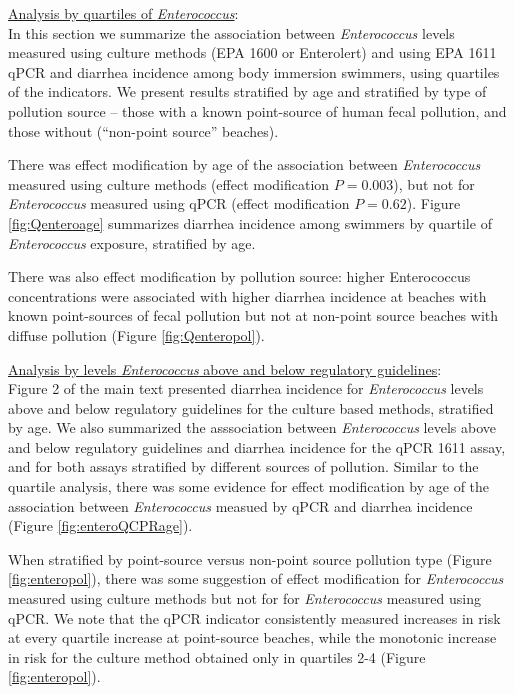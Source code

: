\documentclass[12pt]{article}\usepackage[]{graphicx}\usepackage[]{color}
\begin{document}
\underline{Analysis by quartiles of \textit{Enterococcus}}: \\
In this section we summarize the association between \emph{Enterococcus} levels measured using culture methods (EPA 1600 or Enterolert) and using EPA 1611 qPCR and diarrhea incidence among body immersion swimmers, using quartiles of the indicators.  We present results stratified by age and stratified by type of pollution source -- those with a known point-source of human fecal pollution, and those without (``non-point source'' beaches).  

There was effect modification by age of the association between \textit{Enterococcus} measured using culture methods (effect modification $P=0.003$), but not for \textit{Enterococcus} measured using qPCR (effect modification $P=0.62$).  Figure  \ref{fig:Qenteroage} summarizes diarrhea incidence among swimmers by quartile of \textit{Enterococcus} exposure, stratified by age.

There was also effect modification by pollution source: higher Enterococcus concentrations were associated with higher diarrhea incidence at beaches with known point-sources of fecal pollution but not at non-point source beaches with diffuse pollution (Figure \ref{fig:Qenteropol}).

\medskip
\noindent \underline{Analysis by levels \textit{Enterococcus} above and below regulatory guidelines}: \\
Figure 2 of the main text presented diarrhea incidence for \textit{Enterococcus} levels above and below regulatory guidelines for the culture based methods, stratified by age. We also summarized the asssociation between \emph{Enterococcus} levels above and below regulatory guidelines and diarrhea incidence for the qPCR 1611 assay, and for both assays stratified by different sources of pollution. Similar to the quartile analysis, there was some evidence for effect modification by age of the association between \textit{Enterococcus} measued by qPCR and diarrhea incidence  (Figure \ref{fig:enteroQCPRage}).  

When stratified by point-source versus non-point source pollution type (Figure \ref{fig:enteropol}), there was some suggestion of effect modification for \textit{Enterococcus} measured using culture methods but not for for \textit{Enterococcus} measured using qPCR. We note that the qPCR indicator consistently measured increases in risk at every quartile increase at point-source beaches, while the monotonic increase in risk for the culture method obtained only in quartiles 2-4 (Figure \ref{fig:enteropol}).
\end{document}
